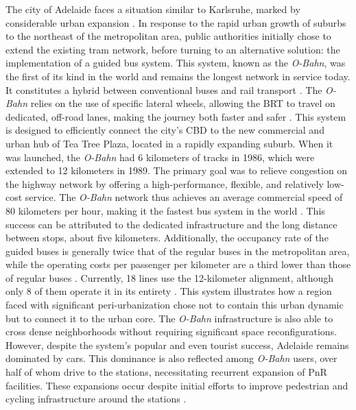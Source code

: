 \begin{refsegment}
{    The city of Adelaide faces a situation similar to Karlsruhe, marked by considerable urban expansion \textcolor{blue}{\autocite[p.~362-377 (Chapter~14)]{cervero_transit_1998}}. In response to the rapid urban growth of suburbs to the northeast of the metropolitan area, public authorities initially chose to extend the existing tram network, before turning to an alternative solution: the implementation of a guided bus system. This system, known as the \textsl{O-Bahn}, was the first of its kind in the world and remains the longest network in service today. It constitutes a hybrid between conventional buses and rail transport \textcolor{blue}{\autocite[143]{currie_assessing_2014}}. The \textsl{O-Bahn} relies on the use of specific lateral wheels, allowing the \acrshort{BRT} to travel on dedicated, off-road lanes, making the journey both faster and safer \textcolor{blue}{\autocite[2]{currie_bus_2006}}. This system is designed to efficiently connect the city's \acrfull{CBD} to the new commercial and urban hub of Tea Tree Plaza, located in a rapidly expanding suburb. When it was launched, the \textsl{O-Bahn} had 6 kilometers of tracks in 1986, which were extended to 12 kilometers in 1989. The primary goal was to relieve congestion on the highway network by offering a high-performance, flexible, and relatively low-cost service. The \textsl{O-Bahn} network thus achieves an average commercial speed of 80 kilometers per hour, making it the fastest bus system in the world \textcolor{blue}{\autocite[3]{currie_bus_2006}}. This success can be attributed to the dedicated infrastructure and the long distance between stops, about five kilometers. Additionally, the occupancy rate of the guided buses is generally twice that of the regular buses in the metropolitan area, while the operating costs per passenger per kilometer are a third lower than those of regular buses \textcolor{blue}{\autocite[7]{basbas_advances_2005}}. Currently, 18 lines use the 12-kilometer alignment, although only 8 of them operate it in its entirety \textcolor{blue}{\autocite[3]{rogers_o-bahn_2002}}. This system illustrates how a region faced with significant peri-urbanization chose not to contain this urban dynamic but to connect it to the urban core. The \textsl{O-Bahn} infrastructure is also able to cross dense neighborhoods without requiring significant space reconfigurations. However, despite the system's popular and even tourist success, Adelaide remains dominated by cars. This dominance is also reflected among \textsl{O-Bahn} users, over half of whom drive to the stations, necessitating recurrent expansion of \acrfull{PnR} facilities. These expansions occur despite initial efforts to improve pedestrian and cycling infrastructure around the stations \textcolor{blue}{\autocite[11]{currie_bus_2006}}.
}
\end{refsegment}
